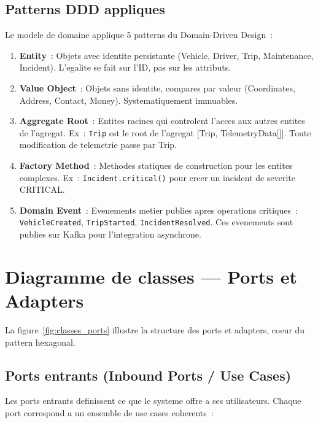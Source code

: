 \documentclass[12pt,a4paper]{report}
\begin{document}
\subsection{Patterns DDD appliques}

Le modele de domaine applique 5 patterns du Domain-Driven Design~:

\begin{enumerate}[leftmargin=2cm]
  \item \textbf{Entity}~: Objets avec identite persistante (Vehicle, Driver,
        Trip, Maintenance, Incident). L'egalite se fait sur l'ID, pas sur
        les attributs.
        
  \item \textbf{Value Object}~: Objets sans identite, compares par valeur
        (Coordinates, Address, Contact, Money). Systematiquement immuables.
        
  \item \textbf{Aggregate Root}~: Entites racines qui controlent l'acces
        aux autres entites de l'agregat. Ex~: \texttt{Trip} est le root
        de l'agregat [Trip, TelemetryData[]]. Toute modification de
        telemetrie passe par Trip.
        
  \item \textbf{Factory Method}~: Methodes statiques de construction
        pour les entites complexes. Ex~: \texttt{Incident.critical()}
        pour creer un incident de severite CRITICAL.
        
  \item \textbf{Domain Event}~: Evenements metier publies apres operations
        critiques~: \texttt{VehicleCreated}, \texttt{TripStarted},
        \texttt{IncidentResolved}. Ces evenements sont publies sur Kafka
        pour l'integration asynchrone.
\end{enumerate}

\section{Diagramme de classes --- Ports et Adapters}

La figure~\ref{fig:classes_ports} illustre la structure des ports
et adapters, coeur du pattern hexagonal.

\subsection{Ports entrants (Inbound Ports / Use Cases)}

Les ports entrants definissent ce que le systeme offre a ses utilisateurs.
Chaque port correspond a un ensemble de use cases coherents~:
\end{document}

